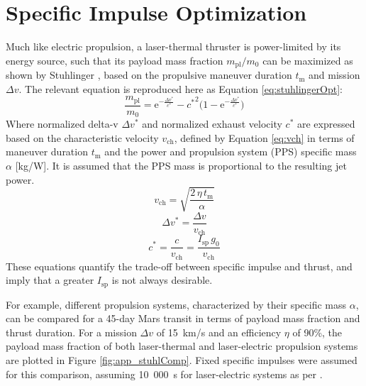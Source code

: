 \documentclass[final,3p,times,twocolumn,sort&compress, lefttitle]{elsarticle}
\begin{document}
    \appendix
        \section{Specific Impulse Optimization}
            \setcounter{figure}{0}
            \label{sec:app_IspOpt}
            
            Much like electric propulsion, a laser-thermal thruster is power-limited by its energy source, such that its payload mass fraction $m_\mathrm{pl}/m_0$ can be maximized as shown by Stuhlinger \cite{stuhlinger_electric_1967}, based on the propulsive maneuver duration $t_\mathrm{m}$ and mission $\Delta v$. The relevant equation is reproduced here as Equation \ref{eq:stuhlingerOpt}:
            \begin{equation}
                \frac{m_\mathrm{pl}}{m_0} = \mathrm{e}^{- \frac{\Delta v^*}{c^*}}-{c^*}^2\Big(1-\mathrm{e}^{- \frac{\Delta v^*}{c^*}}\Big)
                \label{eq:stuhlingerOpt}
            \end{equation}
            Where normalized delta-v $\Delta v^*$ and normalized exhaust velocity $c^*$ are expressed based on the characteristic velocity $v_\mathrm{ch}$, defined by Equation \ref{eq:vch} in terms of maneuver duration $t_\mathrm{m}$ and the power and propulsion system (PPS) specific mass $\alpha$ [kg/W]. It is assumed that the PPS mass is proportional to the resulting jet power.
            \begin{equation}
                v_\mathrm{ch} = \sqrt{\frac{2\,\eta\,t_\mathrm{m}}{\alpha}}
                \label{eq:vch}
            \end{equation}
            \begin{equation}\Delta v^* = \frac{\Delta v}{v_\mathrm{ch}}\end{equation}
            \begin{equation}c^* = \frac{c}{v_\mathrm{ch}} = \frac{I_\mathrm{sp}\,g_0}{v_\mathrm{ch}}\end{equation}
            These equations quantify the trade-off between specific impulse and thrust, and imply that a greater $I_\mathrm{sp}$ is not always desirable.
            
            For example, different propulsion systems, characterized by their specific mass $\alpha$, can be compared for a 45-day Mars transit in terms of payload mass fraction and thrust duration. For a mission $\Delta v$ of 15~km/s and an efficiency $\eta$ of 90\%, the payload mass fraction of both laser-thermal and laser-electric propulsion systems are plotted in Figure \ref{fig:app_stuhlComp}. Fixed specific impulses were assumed for this comparison, assuming 10~000~s for laser-electric systems as per \cite{sheerin_fast_2021}.
            
\end{document}
